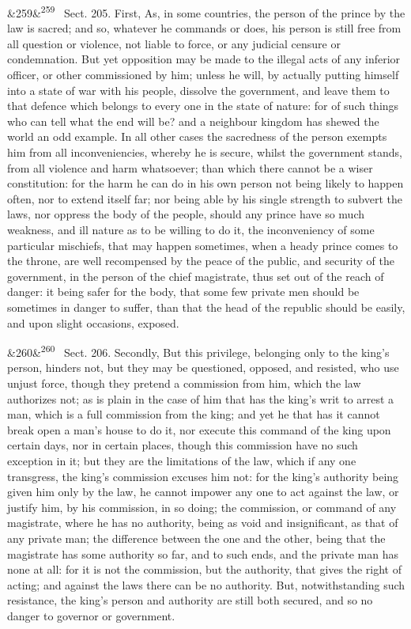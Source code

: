 \documentclass[12pt]{article}
\newcommand{\para}[1][]{\par\noindent\ifx&#1&\else\textsuperscript{\footnotesize #1}~\fi}
\begin{document}
\para[259] Sect. 205. First, As, in some countries, the person of the prince by the law is sacred; and so, whatever he commands or does, his person is still free from all question or violence, not liable to force, or any judicial censure or condemnation. But yet opposition may be made to the illegal acts of any inferior officer, or other commissioned by him; unless he will, by actually putting himself into a state of war with his people, dissolve the government, and leave them to that defence which belongs to every one in the state of nature: for of such things who can tell what the end will be? and a neighbour kingdom has shewed the world an odd example. In all other cases the sacredness of the person exempts him from all inconveniencies, whereby he is secure, whilst the government stands, from all violence and harm whatsoever; than which there cannot be a wiser constitution: for the harm he can do in his own person not being likely to happen often, nor to extend itself far; nor being able by his single strength to subvert the laws, nor oppress the body of the people, should any prince have so much weakness, and ill nature as to be willing to do it, the inconveniency of some particular mischiefs, that may happen sometimes, when a heady prince comes to the throne, are well recompensed by the peace of the public, and security of the government, in the person of the chief magistrate, thus set out of the reach of danger: it being safer for the body, that some few private men should be sometimes in danger to suffer, than that the head of the republic should be easily, and upon slight occasions, exposed.

\para[260] Sect. 206. Secondly, But this privilege, belonging only to the king's person, hinders not, but they may be questioned, opposed, and resisted, who use unjust force, though they pretend a commission from him, which the law authorizes not; as is plain in the case of him that has the king's writ to arrest a man, which is a full commission from the king; and yet he that has it cannot break open a man's house to do it, nor execute this command of the king upon certain days, nor in certain places, though this commission have no such exception in it; but they are the limitations of the law, which if any one transgress, the king's commission excuses him not: for the king's authority being given him only by the law, he cannot impower any one to act against the law, or justify him, by his commission, in so doing; the commission, or command of any magistrate, where he has no authority, being as void and insignificant, as that of any private man; the difference between the one and the other, being that the magistrate has some authority so far, and to such ends, and the private man has none at all: for it is not the commission, but the authority, that gives the right of acting; and against the laws there can be no authority. But, notwithstanding such resistance, the king's person and authority are still both secured, and so no danger to governor or government.
\end{document}
